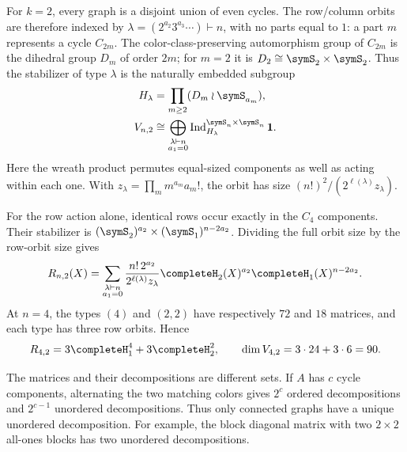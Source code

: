 \begin{example}
\label{regularMatrixTwoMatchings}
For $k=2$, every graph is a disjoint union of even cycles.
The row/column orbits are therefore indexed by
$\lambda=(2^{a_2}3^{a_3}\dotsm)\vdash n$, with no parts equal to $1$:
a part $m$ represents a cycle $C_{2m}$.
The color-class-preserving automorphism group of $C_{2m}$ is the
dihedral group $D_m$ of order $2m$; for $m=2$ it is
$D_2\cong\symS_2\times\symS_2$.
Thus the stabilizer of type $\lambda$ is the naturally embedded subgroup
\begin{align*}
 H_\lambda&=\prod_{m\geq2}(D_m\wr\symS_{a_m}),\\
 V_{n,2}&\cong\bigoplus_{\substack{\lambda\vdash n\\a_1=0}}
       \operatorname{Ind}_{H_\lambda}^{\symS_n\times\symS_n}\mathbf1.
\end{align*}
Here the wreath product permutes equal-sized components as well as acting
within each one. With $z_\lambda=\prod_m m^{a_m}a_m!$, the orbit has size
$(n!)^2/(2^{\ell(\lambda)}z_\lambda)$.

For the row action alone, identical rows occur exactly in the $C_4$
components. Their stabilizer is
$(\symS_2)^{a_2}\times(\symS_1)^{n-2a_2}$. Dividing the full orbit size
by the row-orbit size gives
\[
 R_{n,2}(X)=
 \sum_{\substack{\lambda\vdash n\\a_1=0}}
 \frac{n!\,2^{a_2}}{2^{\ell(\lambda)}z_\lambda}
 \completeH_2(X)^{a_2}\completeH_1(X)^{n-2a_2}.
\]
At $n=4$, the types $(4)$ and $(2,2)$ have respectively $72$ and $18$
matrices, and each type has three row orbits. Hence
\[
 R_{4,2}=3\completeH_1^4+3\completeH_2^2,\qquad
 \dim V_{4,2}=3\cdot24+3\cdot6=90.
\]

The matrices and their decompositions are different sets.
If $A$ has $c$ cycle components, alternating the two matching colors gives
$2^c$ ordered decompositions and $2^{c-1}$ unordered decompositions.
Thus only connected graphs have a unique unordered decomposition.
For example, the block diagonal matrix with two $2\times2$ all-ones blocks
has two unordered decompositions.
\end{example}

